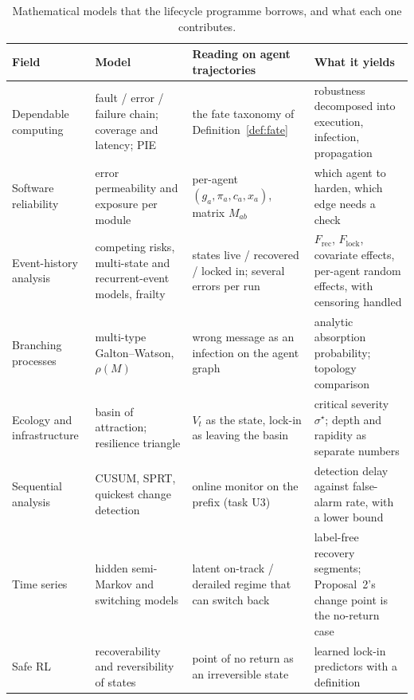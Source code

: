 \begin{table}[h]\centering\small
\begin{tabularx}{\linewidth}{@{}>{\RaggedRight\hsize=0.7\hsize}X >{\RaggedRight\hsize=0.95\hsize}X >{\RaggedRight\hsize=1.2\hsize}X >{\RaggedRight\hsize=1.15\hsize}X@{}}\toprule
Field & Model & Reading on agent trajectories & What it yields \\\midrule
Dependable computing \cite{avizienis2004dependability,arlat1990fault,voas1992pie} & fault / error / failure chain; coverage and latency; PIE & the fate taxonomy of Definition~\ref{def:fate} & robustness decomposed into execution, infection, propagation \\
Software reliability \cite{hiller2004epic} & error permeability and exposure per module & per-agent $(g_a,\pi_a,c_a,x_a)$, matrix $M_{ab}$ & which agent to harden, which edge needs a check \\
Event-history analysis \cite{putter2007multistate,aalen1978empirical,andersen1982cox,vaupel1979frailty} & competing risks, multi-state and recurrent-event models, frailty & states live / recovered / locked in; several errors per run & $F_{\mathrm{rec}}$, $F_{\mathrm{lock}}$, covariate effects, per-agent random effects, with censoring handled \\
Branching processes \cite{harris1963branching} & multi-type Galton--Watson, $\rho(M)$ & wrong message as an infection on the agent graph & analytic absorption probability; topology comparison \\
Ecology and infrastructure \cite{holling1973resilience,bruneau2003resilience} & basin of attraction; resilience triangle & $V_t$ as the state, lock-in as leaving the basin & critical severity $\sigma^\star$; depth and rapidity as separate numbers \\
Sequential analysis \cite{page1954cusum,lorden1971,tartakovsky2014sequential} & CUSUM, SPRT, quickest change detection & online monitor on the prefix (task U3) & detection delay against false-alarm rate, with a lower bound \\
Time series \cite{yu2010hsmm,adams2007bocpd} & hidden semi-Markov and switching models & latent on-track / derailed regime that can switch back & label-free recovery segments; Proposal~2's change point is the no-return case \\
Safe RL \cite{moldovan2012safe,grinsztajn2021reversibility} & recoverability and reversibility of states & point of no return as an irreversible state & learned lock-in predictors with a definition \\\bottomrule
\end{tabularx}
\caption{Mathematical models that the lifecycle programme borrows, and what each one contributes.}
\label{tab:lifecycle_models}
\end{table}

